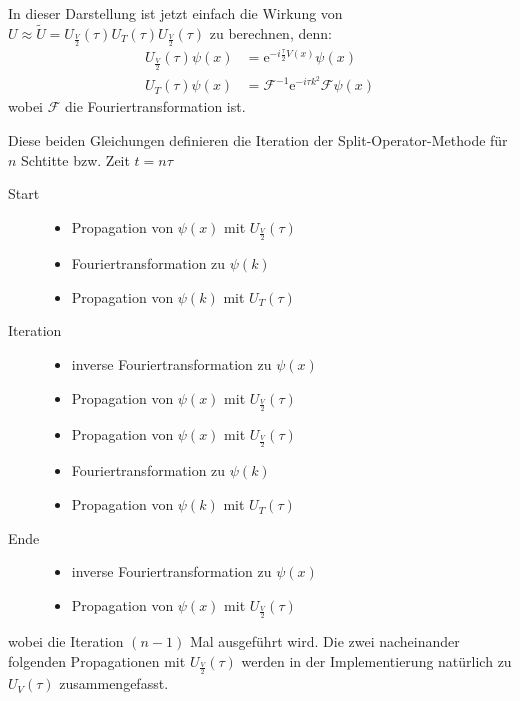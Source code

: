 \documentclass[10pt,a4paper,german]{scrartcl}
\begin{document}
		In dieser Darstellung ist jetzt einfach die Wirkung von
		$U \approx \tilde{U}=U_{\frac{V}{2}}(\tau) U_T(\tau) U_{\frac{V}{2}}(\tau)$
		zu berechnen,	denn:
		\begin{align}
		\label{it:hV}
			U_{\frac{V}{2}}(\tau) \psi(x) &= \mathrm{e}^{-i \frac{\tau}{2} V(x)} \psi(x)\\
		\label{it:T}
			U_T(\tau) \psi(x) &= \mathcal{F}^{-1} \mathrm{e}^{-i \tau k^2} \mathcal{F} \psi(x)
		\end{align}
		wobei $\mathcal{F}$ die Fouriertransformation ist.

		Diese beiden Gleichungen definieren die Iteration der Split-Operator-Methode
		für $n$ Schtitte bzw. Zeit $t=n \tau$

		\begin{description}
			\item[Start]
				\begin{itemize}
					\item Propagation von $\psi(x)$ mit $U_{\frac{V}{2}}(\tau)$
					\item Fouriertransformation zu $\psi(k)$
					\item Propagation von $\psi(k)$ mit $U_T(\tau)$
				\end{itemize}
			\item[Iteration]
				\begin{itemize}
					\item inverse Fouriertransformation zu $\psi(x)$
					\item Propagation von $\psi(x)$ mit $U_{\frac{V}{2}}(\tau)$
					\item Propagation von $\psi(x)$ mit $U_{\frac{V}{2}}(\tau)$
					\item Fouriertransformation zu $\psi(k)$
					\item Propagation von $\psi(k)$ mit $U_T(\tau)$
				\end{itemize}
			\item[Ende]
				\begin{itemize}
					\item inverse Fouriertransformation zu $\psi(x)$
					\item Propagation von $\psi(x)$ mit $U_{\frac{V}{2}}(\tau)$
				\end{itemize}
		\end{description}
		wobei die Iteration $(n-1)$ Mal ausgeführt wird. Die zwei nacheinander folgenden
		Propagationen mit $U_{\frac{V}{2}}(\tau)$ werden in der Implementierung natürlich
		zu $U_V(\tau)$ zusammengefasst.
\end{document}
